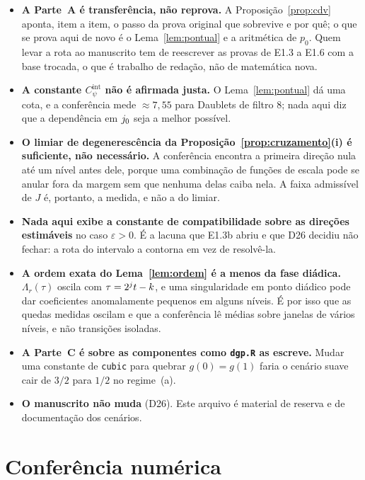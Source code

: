 \documentclass[11pt,a4paper]{article}
\newcommand{\eps}{\varepsilon}
\newcommand{\Cpsiint}{C_{\psi}^{\mathrm{int}}}
\newcommand{\pzero}{p_{0}}
\begin{document}
\begin{itemize}[leftmargin=*]
  \item \textbf{A Parte~A é transferência, não reprova.} A
    Proposição~\ref{prop:cdv} aponta, item a item, o passo da prova original
    que sobrevive e por quê; o que se prova aqui de novo é o
    Lema~\ref{lem:pontual} e a aritmética de $\pzero$. Quem levar a rota ao
    manuscrito tem de reescrever as provas de E1.3 a E1.6 com a base trocada,
    o que é trabalho de redação, não de matemática nova.
  \item \textbf{A constante $\Cpsiint$ não é afirmada justa.} O
    Lema~\ref{lem:pontual} dá uma cota, e a conferência mede
    $\approx 7{,}55$ para Daublets de filtro 8; nada aqui diz que a
    dependência em $j_{0}$ seja a melhor possível.
  \item \textbf{O limiar de degenerescência da
    Proposição~\ref{prop:cruzamento}(i) é suficiente, não necessário.} A
    conferência encontra a primeira direção nula até um nível antes dele,
    porque uma combinação de funções de escala pode se anular fora da margem
    sem que nenhuma delas caiba nela. A faixa admissível de $J$ é, portanto,
    a medida, e não a do limiar.
  \item \textbf{Nada aqui exibe a constante de compatibilidade sobre as
    direções estimáveis} no caso $\eps > 0$. É a lacuna que E1.3b abriu e que
    D26 decidiu não fechar: a rota do intervalo a contorna em vez de resolvê-la.
  \item \textbf{A ordem exata do Lema~\ref{lem:ordem} é a menos da fase
    diádica.} $\Lambda_{r}(\tau)$ oscila com $\tau = 2^{j}t - k$, e uma
    singularidade em ponto diádico pode dar coeficientes anomalamente pequenos
    em alguns níveis. É por isso que as quedas medidas oscilam e que a
    conferência lê médias sobre janelas de vários níveis, e não transições
    isoladas.
  \item \textbf{A Parte~C é sobre as componentes como \texttt{dgp.R} as
    escreve.} Mudar uma constante de \texttt{cubic} para quebrar
    $g(0) = g(1)$ faria o cenário suave cair de $3/2$ para $1/2$ no
    regime~(a).
  \item \textbf{O manuscrito não muda} (D26). Este arquivo é material de
    reserva e de documentação dos cenários.
\end{itemize}

\section{Conferência numérica}
\end{document}
